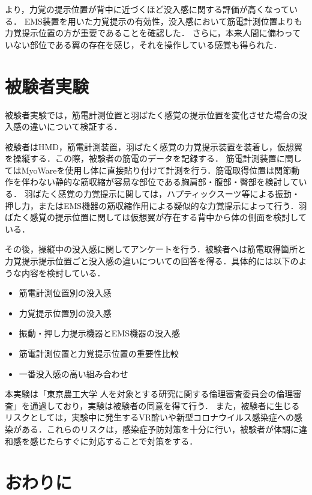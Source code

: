     より，力覚の提示位置が背中に近づくほど没入感に関する評価が高くなっている．
    EMS装置を用いた力覚提示の有効性，没入感において筋電計測位置よりも力覚提示位置の方が重要であることを確認した．
    さらに，本来人間に備わっていない部位である翼の存在を感じ，それを操作している感覚も得られた．

\section{被験者実験}
    
    被験者実験では，筋電計測位置と羽ばたく感覚の提示位置を変化させた場合の没入感の違いについて検証する．
    
    被験者はHMD，筋電計測装置，羽ばたく感覚の力覚提示装置を装着し，仮想翼を操縦する．この際，被験者の筋電のデータを記録する．
    筋電計測装置に関してはMyoWareを使用し体に直接貼り付けて計測を行う．筋電取得位置は関節動作を伴わない静的な筋収縮が容易な部位である胸肩部・腹部・臀部を検討している．
    羽ばたく感覚の力覚提示に関しては，ハプティックスーツ等による振動・押し力，またはEMS機器の筋収縮作用による疑似的な力覚提示によって行う．羽ばたく感覚の提示位置に関しては仮想翼が存在する背中から体の側面を検討している．
    
    その後，操縦中の没入感に関してアンケートを行う．被験者へは筋電取得箇所と力覚提示提示位置ごと没入感の違いについての回答を得る．具体的には以下のような内容を検討している．
    \begin{itemize}
    \item 筋電計測位置別の没入感
    \item 力覚提示位置別の没入感
    \item 振動・押し力提示機器とEMS機器の没入感
    \item 筋電計測位置と力覚提示位置の重要性比較
    \item 一番没入感の高い組み合わせ
    \end{itemize}

    
    本実験は「東京農工大学 人を対象とする研究に関する倫理審査委員会の倫理審査」を通過しており，実験は被験者の同意を得て行う．
    また，被験者に生じるリスクとしては，実験中に発生するVR酔いや新型コロナウイルス感染症への感染がある．これらのリスクは，感染症予防対策を十分に行い，被験者が体調に違和感を感じたらすぐに対応することで対策をする．
    
    



\section{おわりに}